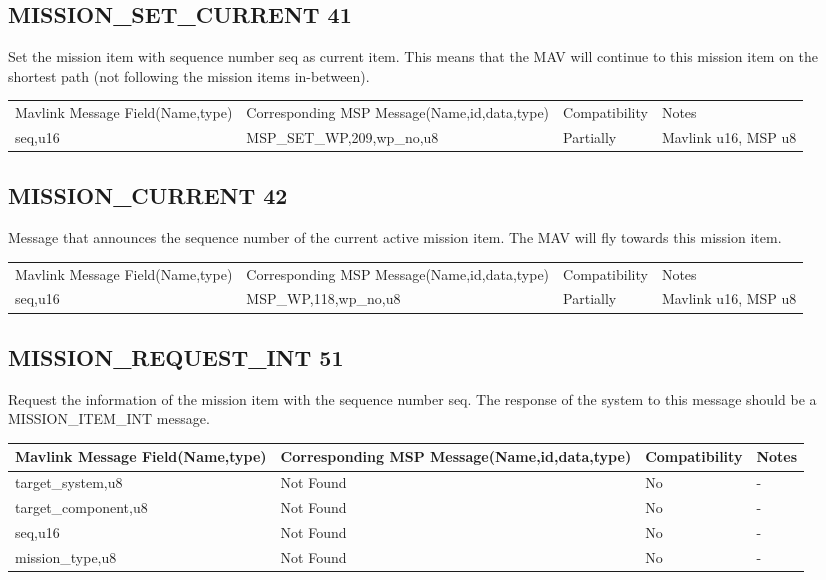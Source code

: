 \cleardoublepage



\subsection{MISSION\_SET\_CURRENT 41} 
Set the mission item with sequence number seq as current item. This means that the MAV will continue to this mission item on the shortest path (not following the mission items in-between). \\

{
\centering
\begin{tabular}{ |p{4cm  } |p{7cm} | p{2cm}|m{5em}|}
\hline
Mavlink Message Field(Name,type)&Corresponding MSP Message(Name,id,data,type)& Compatibility & Notes\\
\rowcolor{lightgray}
seq,u16 & MSP\_SET\_WP,209,wp\_no,u8& Partially  & Mavlink u16, MSP u8  \\

\end{tabular}
}
\cleardoublepage



\subsection{MISSION\_CURRENT 42} 
Message that announces the sequence number of the current active mission item. The MAV will fly towards this mission item. \\ 

{
\centering
\begin{tabular}{ |p{4cm  } |p{7cm} | p{2cm}|m{5em}|}
\hline
Mavlink Message Field(Name,type)&Corresponding MSP Message(Name,id,data,type)& Compatibility & Notes\\
\rowcolor{lightgray}
seq,u16 & MSP\_WP,118,wp\_no,u8& Partially  & Mavlink u16, MSP u8  \\

\end{tabular}
}
\cleardoublepage




\subsection{MISSION\_REQUEST\_INT 51} 
Request the information of the mission item with the sequence number seq. The response of the system to this message should be a MISSION\_ITEM\_INT message. \\
{
\centering
\begin{tabular}{ |p{4cm  } |p{7cm} | p{2cm}|m{5em}|}
\hline
Mavlink Message Field(Name,type)&Corresponding MSP Message(Name,id,data,type)& Compatibility & Notes\\
\hline
target\_system,u8 & Not Found & No & - \\
\hline
target\_component,u8 & Not Found & No & - \\
\hline
seq,u16 & Not Found & No & - \\
\hline
mission\_type,u8 & Not Found & No & - \\
\end{tabular}
}
\cleardoublepage




